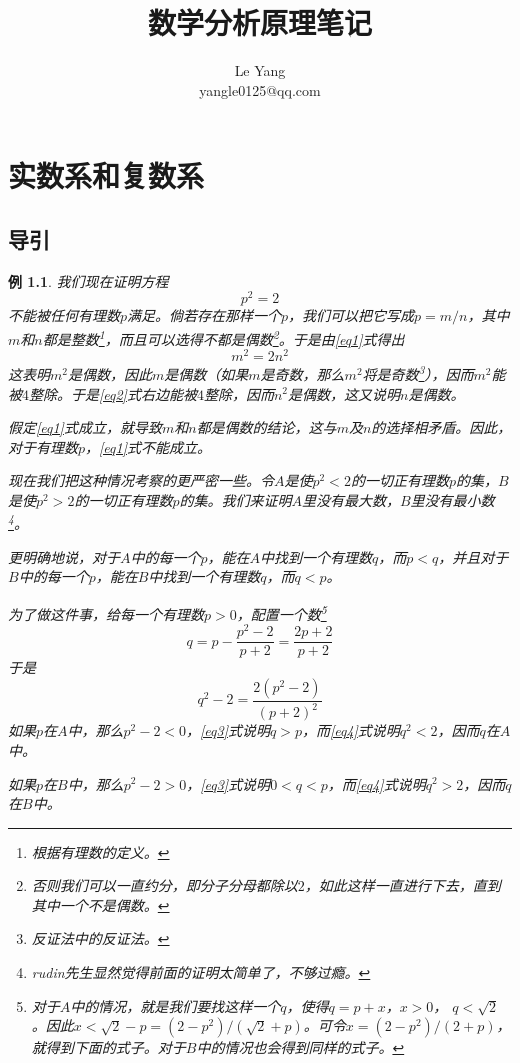 \documentclass[UTF8]{ctexbook}
\newtheorem{example}{例}[chapter]
\begin{document}
\title{数学分析原理笔记}
\author{
Le Yang\\
yangle0125@qq.com
}
\date{}
\maketitle

\tableofcontents

\chapter{实数系和复数系}

\section{导引}

\begin{example}
\label{example1}
我们现在证明方程
\begin{equation}
p^2 = 2	\label{eq1}
\end{equation}
不能被任何有理数$p$满足。倘若存在那样一个$p$，我们可以把它写成$p = m / n$，其中$m$和$n$都是整数\footnote{根据有理数的定义。}，而且可以选得不都是偶数\footnote{否则我们可以一直约分，即分子分母都除以$2$，如此这样一直进行下去，直到其中一个不是偶数。}。于是由\eqref{eq1}式得出
\begin{equation}
m^2 = 2n^2 \label{eq2}
\end{equation}
这表明$m^2$是偶数，因此$m$是偶数（如果$m$是奇数，那么$m^2$将是奇数\footnote{反证法中的反证法。}），因而$m^2$能被$4$整除。于是\eqref{eq2}式右边能被$4$整除，因而$n^2$是偶数，这又说明$n$是偶数。

假定\eqref{eq1}式成立，就导致$m$和$n$都是偶数的结论，这与$m$及$n$的选择相矛盾。因此，对于有理数$p$，\eqref{eq1}式不能成立。

现在我们把这种情况考察的更严密一些。令$A$是使$p^2 < 2$的一切正有理数$p$的集，$B$是使$p^2 > 2$的一切正有理数$p$的集。我们来证明$A$里没有最大数，$B$里没有最小数\footnote{rudin先生显然觉得前面的证明太简单了，不够过瘾。}。

更明确地说，对于$A$中的每一个$p$，能在$A$中找到一个有理数$q$，而$p < q$，并且对于$B$中的每一个$p$，能在$B$中找到一个有理数$q$，而$q < p$。

为了做这件事，给每一个有理数$p > 0$，配置一个数\footnote{对于$A$中的情况，就是我们要找这样一个$q$，使得$q = p + x$，$x > 0$， $q < \sqrt{2}$。因此$x < \sqrt{2} - p = (2 - p^2) / (\sqrt{2} + p)$。可令$x = (2 - p^2) / (2 + p)$，就得到下面的式子。对于$B$中的情况也会得到同样的式子。}
\begin{equation}
q = p - \frac{p^2 - 2}{p + 2} = \frac{2p + 2}{p + 2} \label{eq3}
\end{equation}
于是
\begin{equation}
q^2 - 2 = \frac{2(p^2 - 2)}{(p + 2)^2} \label{eq4}
\end{equation}
如果$p$在$A$中，那么$p^2 - 2 < 0$，\eqref{eq3}式说明$q > p$，而\eqref{eq4}式说明$q^2 < 2$，因而$q$在$A$中。

如果$p$在$B$中，那么$p^2 - 2 > 0$，\eqref{eq3}式说明$0 < q < p$，而\eqref{eq4}式说明$q^2 > 2$，因而$q$在$B$中。
\end{example}
\end{document}
